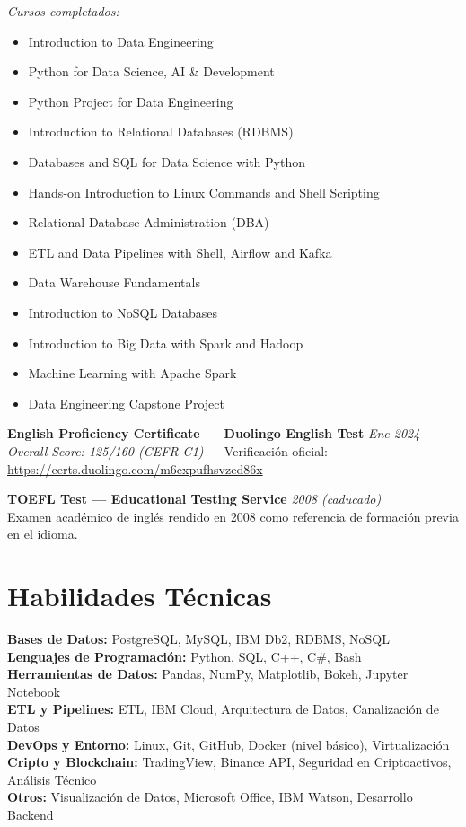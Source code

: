 \documentclass[a4paper,10pt]{article}
\begin{document}
\textit{Cursos completados:}
\begin{itemize}
  \item Introduction to Data Engineering
  \item Python for Data Science, AI & Development
  \item Python Project for Data Engineering
  \item Introduction to Relational Databases (RDBMS)
  \item Databases and SQL for Data Science with Python
  \item Hands-on Introduction to Linux Commands and Shell Scripting
  \item Relational Database Administration (DBA)
  \item ETL and Data Pipelines with Shell, Airflow and Kafka
  \item Data Warehouse Fundamentals
  \item Introduction to NoSQL Databases
  \item Introduction to Big Data with Spark and Hadoop
  \item Machine Learning with Apache Spark
  \item Data Engineering Capstone Project
\end{itemize}

\vspace{6pt}

\textbf{English Proficiency Certificate — Duolingo English Test} \hfill \textit{Ene 2024} \\
\textit{Overall Score: 125/160 (CEFR C1)} — Verificación oficial: \\
\url{https://certs.duolingo.com/m6cxpufhsvzed86x}

\vspace{3pt}

\textbf{TOEFL Test — Educational Testing Service} \hfill \textit{2008 (caducado)} \\
Examen académico de inglés rendido en 2008 como referencia de formación previa en el idioma.



\vspace{10pt}

\section*{Habilidades Técnicas}
\textbf{Bases de Datos:} PostgreSQL, MySQL, IBM Db2, RDBMS, NoSQL \\
\textbf{Lenguajes de Programación:} Python, SQL, C++, C\#, Bash \\
\textbf{Herramientas de Datos:} Pandas, NumPy, Matplotlib, Bokeh, Jupyter Notebook \\
\textbf{ETL y Pipelines:} ETL, IBM Cloud, Arquitectura de Datos, Canalización de Datos \\
\textbf{DevOps y Entorno:} Linux, Git, GitHub, Docker (nivel básico), Virtualización \\
\textbf{Cripto y Blockchain:} TradingView, Binance API, Seguridad en Criptoactivos, Análisis Técnico \\
\textbf{Otros:} Visualización de Datos, Microsoft Office, IBM Watson, Desarrollo Backend
\end{document}
